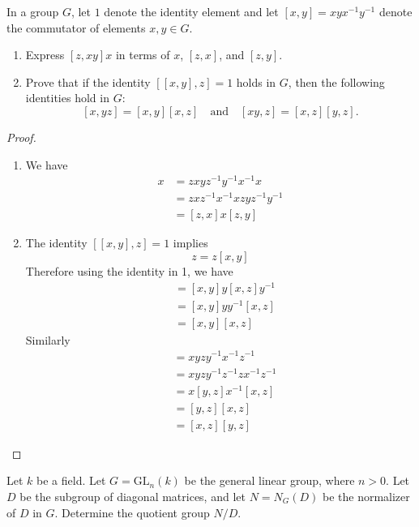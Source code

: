 \begin{prob}[F2003-Q1]
    In a group \( G \), let \( 1 \) denote the identity element and let \([x, y] = xyx^{-1}y^{-1}\) denote the commutator of elements \(x, y \in G\).
    
    \begin{enumerate}
        \item Express \([z, xy]x\) in terms of \(x\), \([z, x]\), and \([z, y]\).
        
        \item Prove that if the identity \([[x, y], z] = 1\) holds in \(G\), then the following identities hold in \(G\):
        \[
        [x, yz] = [x, y][x, z] \quad \text{and} \quad [xy, z] = [x, z][y, z].
        \]
    \end{enumerate}
\end{prob}
\begin{proof}
    \begin{enumerate}
        \item We have 
        \begin{align*}
            [z,xy]x&=zxyz^{-1}y^{-1}x^{-1}x\\
            &=zxz^{-1}x^{-1}xzyz^{-1}y^{-1}\\
            &=[z,x]x[z,y]
        \end{align*}
        \item The identity $[[x,y],z]=1$ implies 
        \begin{equation*}
            [x,y]z=z[x,y]
        \end{equation*}
        Therefore using the identity in 1, we have 
        \begin{align*}
            [x,yz]&=[x,y]y[x,z]y^{-1}\\
            &=[x,y]yy^{-1}[x,z]\\
            &=[x,y][x,z]
        \end{align*}
        Similarly
        \begin{align*}
            [xy,z]&=xyzy^{-1}x^{-1}z^{-1}\\
            &=xyzy^{-1}z^{-1}zx^{-1}z^{-1}\\
            &=x[y,z]x^{-1}[x,z]\\
            &=[y,z][x,z]\\
            &=[x,z][y,z]
        \end{align*}
    \end{enumerate}
\end{proof}

\begin{prob}[S2005-Q1]
    Let $k$ be a field. Let $G = \mathrm{GL}_n(k)$ be the general linear group, where $n > 0$. Let $D$ be the subgroup of diagonal matrices, and let $N = N_G(D)$ be the normalizer of $D$ in $G$. Determine the quotient group $N/D$.
\end{prob}


